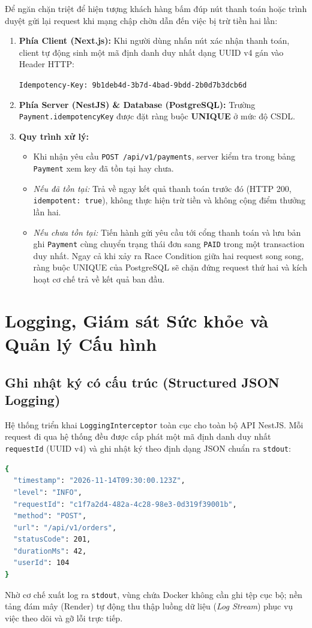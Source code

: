 \documentclass[11pt, a4paper]{article}
\begin{document}
Để ngăn chặn triệt để hiện tượng khách hàng bấm đúp nút thanh toán hoặc trình duyệt gửi lại request khi mạng chập chờn dẫn đến việc bị trừ tiền hai lần:
\begin{enumerate}
	\item \textbf{Phía Client (Next.js):} Khi người dùng nhấn nút xác nhận thanh toán, client tự động sinh một mã định danh duy nhất dạng UUID v4 gán vào Header HTTP:
	      \begin{center}
		      \texttt{Idempotency-Key: 9b1deb4d-3b7d-4bad-9bdd-2b0d7b3dcb6d}
	      \end{center}
	\item \textbf{Phía Server (NestJS) \& Database (PostgreSQL):} Trường \texttt{Payment.idempotencyKey} được đặt ràng buộc \textbf{UNIQUE} ở mức độ CSDL.
	\item \textbf{Quy trình xử lý:}
	      \begin{itemize}
		      \item Khi nhận yêu cầu \texttt{POST /api/v1/payments}, server kiểm tra trong bảng \texttt{Payment} xem key đã tồn tại hay chưa.
		      \item \textit{Nếu đã tồn tại:} Trả về ngay kết quả thanh toán trước đó (HTTP 200, \texttt{idempotent: true}), không thực hiện trừ tiền và không cộng điểm thưởng lần hai.
		      \item \textit{Nếu chưa tồn tại:} Tiến hành gửi yêu cầu tới cổng thanh toán và lưu bản ghi \texttt{Payment} cùng chuyển trạng thái đơn sang \texttt{PAID} trong một transaction duy nhất. Ngay cả khi xảy ra Race Condition giữa hai request song song, ràng buộc UNIQUE của PostgreSQL sẽ chặn đứng request thứ hai và kích hoạt cơ chế trả về kết quả ban đầu.
	      \end{itemize}
\end{enumerate}

\section{Logging, Giám sát Sức khỏe và Quản lý Cấu hình}

\subsection{Ghi nhật ký có cấu trúc (Structured JSON Logging)}

Hệ thống triển khai \texttt{LoggingInterceptor} toàn cục cho toàn bộ API NestJS. Mỗi request đi qua hệ thống đều được cấp phát một mã định danh duy nhất \texttt{requestId} (UUID v4) và ghi nhật ký theo định dạng JSON chuẩn ra \texttt{stdout}:
\begin{lstlisting}[language=bash]
{
  "timestamp": "2026-11-14T09:30:00.123Z",
  "level": "INFO",
  "requestId": "c1f7a2d4-482a-4c28-98e3-0d319f39001b",
  "method": "POST",
  "url": "/api/v1/orders",
  "statusCode": 201,
  "durationMs": 42,
  "userId": 104
}
\end{lstlisting}
Nhờ cơ chế xuất log ra \texttt{stdout}, vùng chứa Docker không cần ghi tệp cục bộ; nền tảng đám mây (Render) tự động thu thập luồng dữ liệu (\textit{Log Stream}) phục vụ việc theo dõi và gỡ lỗi trực tiếp.
\end{document}
